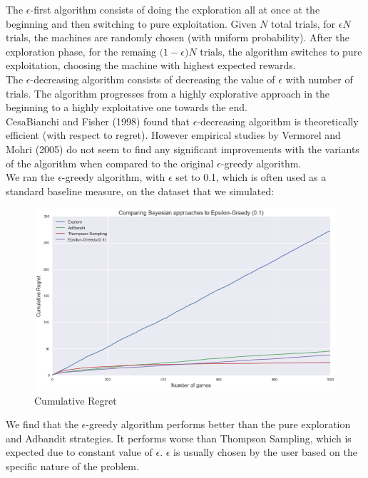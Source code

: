\documentclass{article}
\begin{document}
The $\epsilon$-first algorithm consists of doing the exploration all at once at the beginning and then switching to pure exploitation. Given $N$ total trials, for $\epsilon N$ trials, the machines are randomly chosen (with uniform probability). After the exploration phase, for the remaing $\big( 1-\epsilon \big) N$ trials, the algorithm switches to pure exploitation, choosing the machine with highest expected rewards.\\

The $\epsilon$-decreasing algorithm consists of decreasing the value of $\epsilon$ with number of trials. The algorithm progresses from a highly explorative approach in the beginning to a highly exploitative one towards the end.\\

CesaBianchi and Fisher (1998) found that $\epsilon$-decreasing algorithm is theoretically efficient (with respect to regret). However empirical studies by Vermorel and Mohri (2005) do not seem to find any significant improvements with the variants of the algorithm when compared to the original $\epsilon$-greedy algorithm.\\

We ran the $\epsilon$-greedy algorithm, with $\epsilon$ set to 0.1, which is often used as a standard baseline measure, on the dataset that we simulated:

\begin{figure}[H]
\centering
\includegraphics[scale=0.4]{eps_greedy.png}
\caption{Cumulative Regret}
\end{figure}

We find that the $\epsilon$-greedy algorithm performs better than the pure exploration and Adbandit strategies. It performs worse than Thompson Sampling, which is expected due to constant value of $\epsilon$. $\epsilon$ is usually chosen by the user based on the specific nature of the problem.
\end{document}
